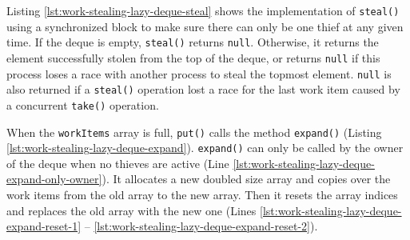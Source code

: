

Listing \ref{lst:work-stealing-lazy-deque-steal} shows the
implementation of \lstinline!steal()! using a synchronized block to
make sure there can only be one thief at any given time. If the deque
is empty, \lstinline!steal()! returns \lstinline!null!. Otherwise, it
returns the element successfully stolen from the top of the deque, or
returns \lstinline!null! if this process loses a race with another
process to steal the topmost element. \lstinline!null! is also
returned if a \lstinline!steal()! operation lost a race for the last
work item caused by a concurrent \lstinline!take()! operation.



When the \lstinline!workItems! array is full, \lstinline!put()! calls
the method \lstinline!expand()! (Listing
\ref{lst:work-stealing-lazy-deque-expand}). \lstinline!expand()! can
only be called by the owner of the deque when no thieves are active
(Line \ref{lst:work-stealing-lazy-deque-expand-only-owner}). It
allocates a new doubled size array and copies over the work items from
the old array to the new array. Then it resets the array indices and
replaces the old array with the new one (Lines
\ref{lst:work-stealing-lazy-deque-expand-reset-1} --
\ref{lst:work-stealing-lazy-deque-expand-reset-2}).




